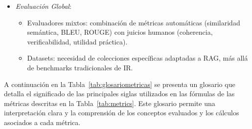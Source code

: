 \begin{itemize}
\begin{itemize}
        \item \textit{Evaluación Global}: 
        \begin{itemize}
            \item Evaluadores mixtos: combinación de métricas automáticas (similaridad semántica, BLEU, ROUGE) con juicios humanos (coherencia, verificabilidad, utilidad práctica).
            \item Datasets: necesidad de colecciones específicas adaptadas a RAG, más allá de benchmarks tradicionales de IR.
        \end{itemize}
    \end{itemize}
    
\end{itemize}
A continuación en la Tabla~\ref{tab:glosariometricas} se presenta un glosario que detalla el significado de las principales
siglas utilizados en las fórmulas de las métricas descritas en la Tabla~\ref{tab:metrics}.
Este glosario permite una interpretación clara y la comprensión de los conceptos evaluados y los cálculos asociados
a cada métrica.

